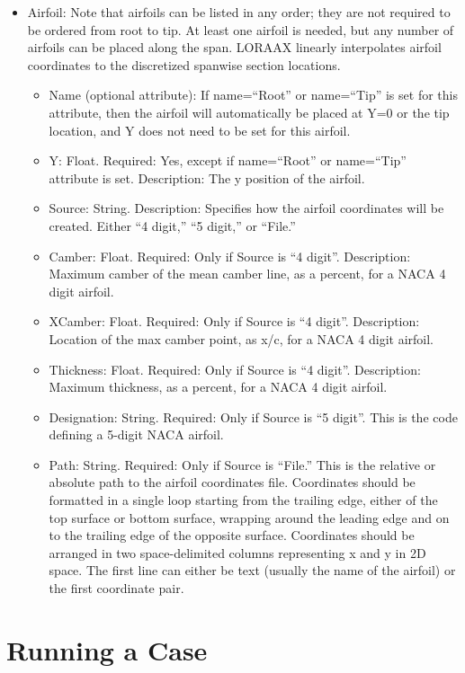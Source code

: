 \documentclass[11pt]{article}
\begin{document}
\begin{itemize}
	\item Airfoil: Note that airfoils can be listed in any order; they are not
		required to be ordered from root to tip. At least one airfoil is
		needed, but any number of airfoils can be placed along the span.
		LORAAX linearly interpolates airfoil coordinates to the discretized
		spanwise section locations.
	\begin{itemize}
		\item Name (optional attribute): If name=``Root'' or name=``Tip'' is set for
			this attribute, then the airfoil will automatically be placed at
			Y=0 or the tip location, and Y does not need to be set for this
			airfoil.
		\item Y: Float. Required: Yes, except if name=``Root'' or name=``Tip''
			attribute is set. Description: The y position of the airfoil.
		\item Source: String. Description: Specifies how the airfoil coordinates
			will be created. Either ``4 digit,'' ``5 digit,'' or ``File.'' 
		\item Camber: Float. Required: Only if Source is ``4 digit''. Description:
			Maximum camber of the mean camber line, as a percent, for a NACA 4 digit
			airfoil.
		\item XCamber: Float. Required: Only if Source is ``4 digit''. Description:
			Location of the max camber point, as x/c, for a NACA 4 digit airfoil.
		\item Thickness: Float. Required: Only if Source is ``4 digit''.
			Description: Maximum thickness, as a percent, for a NACA 4 digit airfoil.
		\item Designation: String. Required: Only if Source is ``5 digit''. This is
			the code defining a 5-digit NACA airfoil.
		\item Path: String. Required: Only if Source is ``File.'' This is the
			relative or absolute path to the airfoil coordinates file.
			Coordinates should be formatted in a single loop starting from the
			trailing edge, either of the top surface or bottom surface, wrapping
			around the leading edge and on to the trailing edge of the opposite
			surface. Coordinates should be arranged in two space-delimited
			columns representing
			x and y in 2D space. The first line can either be text (usually the
			name of the airfoil) or the first coordinate pair.
	\end{itemize}
\end{itemize}

\section{Running a Case}
\end{document}
